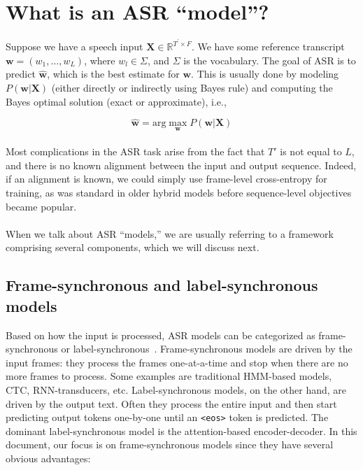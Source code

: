 \section{What is an ASR ``model''?}
\label{sec:asr}

Suppose we have a speech input $\mathbf{X}\in \mathbb{R}^{T^{\prime}\times F}$. 
%
We have some reference transcript $\mathbf{w} = (w_1,\ldots,w_L)$, where $w_l \in \Sigma$, and $\Sigma$ is the vocabulary. 
%
The goal of ASR is to predict $\hat{\mathbf{w}}$, which is the best estimate for $\mathbf{w}$. 
%
This is usually done by modeling $P(\mathbf{w}|\mathbf{X})$ (either directly or indirectly using Bayes rule) and computing the Bayes optimal solution (exact or approximate), i.e., 

\begin{equation}
\label{eq:asr}
    \hat{\mathbf{w}} = \text{arg}\max_{\mathbf{w}} P(\mathbf{w}|\mathbf{X})
\end{equation}

\paragraph{} Most complications in the ASR task arise from the fact that $T'$ is not equal to $L$, and there is no known alignment between the input and output sequence. 
%
Indeed, if an alignment is known, we could simply use frame-level cross-entropy for training, as was standard in older hybrid models before sequence-level objectives became popular.

\paragraph{} When we talk about ASR ``models,'' we are usually referring to a framework comprising several components, which we will discuss next.

\subsection{Frame-synchronous and label-synchronous models}

Based on how the input is processed, ASR models can be categorized as frame-synchronous or label-synchronous~\cite{Prabhavalkar2017ACO, Dong2020ACO}. 
%
Frame-synchronous models are driven by the input frames: they process the frames one-at-a-time and stop when there are no more frames to process. 
%
Some examples are traditional HMM-based models, CTC, RNN-transducers, etc. Label-synchronous models, on the other hand, are driven by the output text. 
%
Often they process the entire input and then start predicting output tokens one-by-one until an \texttt{<eos>} token is predicted. 
%
The dominant label-synchronous model is the attention-based encoder-decoder. 
%
In this document, our focus is on frame-synchronous models since they have several obvious advantages:

